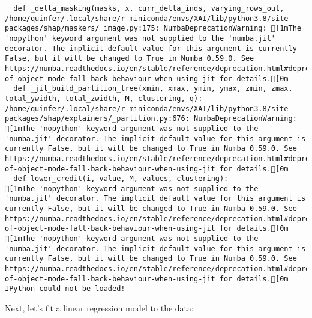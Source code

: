 \documentclass[
  letterpaper,
  DIV=11,
  numbers=noendperiod]{scrartcl}
\begin{document}
\begin{verbatim}
  def _delta_masking(masks, x, curr_delta_inds, varying_rows_out,
/home/quinfer/.local/share/r-miniconda/envs/XAI/lib/python3.8/site-packages/shap/maskers/_image.py:175: NumbaDeprecationWarning: [1mThe 'nopython' keyword argument was not supplied to the 'numba.jit' decorator. The implicit default value for this argument is currently False, but it will be changed to True in Numba 0.59.0. See https://numba.readthedocs.io/en/stable/reference/deprecation.html#deprecation-of-object-mode-fall-back-behaviour-when-using-jit for details.[0m
  def _jit_build_partition_tree(xmin, xmax, ymin, ymax, zmin, zmax, total_ywidth, total_zwidth, M, clustering, q):
/home/quinfer/.local/share/r-miniconda/envs/XAI/lib/python3.8/site-packages/shap/explainers/_partition.py:676: NumbaDeprecationWarning: [1mThe 'nopython' keyword argument was not supplied to the 'numba.jit' decorator. The implicit default value for this argument is currently False, but it will be changed to True in Numba 0.59.0. See https://numba.readthedocs.io/en/stable/reference/deprecation.html#deprecation-of-object-mode-fall-back-behaviour-when-using-jit for details.[0m
  def lower_credit(i, value, M, values, clustering):
[1mThe 'nopython' keyword argument was not supplied to the 'numba.jit' decorator. The implicit default value for this argument is currently False, but it will be changed to True in Numba 0.59.0. See https://numba.readthedocs.io/en/stable/reference/deprecation.html#deprecation-of-object-mode-fall-back-behaviour-when-using-jit for details.[0m
[1mThe 'nopython' keyword argument was not supplied to the 'numba.jit' decorator. The implicit default value for this argument is currently False, but it will be changed to True in Numba 0.59.0. See https://numba.readthedocs.io/en/stable/reference/deprecation.html#deprecation-of-object-mode-fall-back-behaviour-when-using-jit for details.[0m
IPython could not be loaded!
\end{verbatim}

Next, let's fit a linear regression model to the data:
\end{document}
